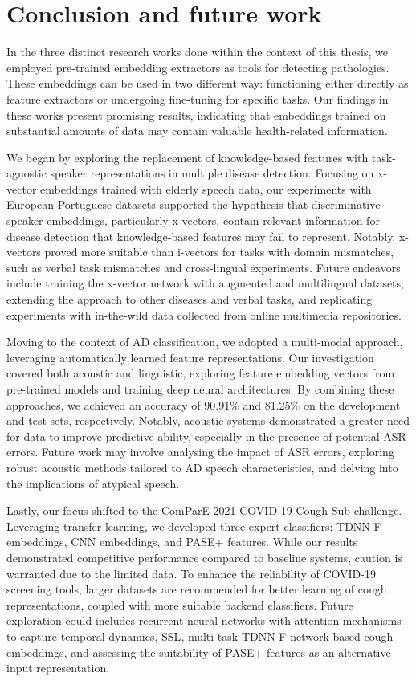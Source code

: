 \section{Conclusion and future work}
In the three distinct research works done within the context of this thesis, we employed pre-trained embedding extractors as tools for detecting pathologies. These embeddings can be used in two different way: functioning either directly as feature extractors or undergoing fine-tuning for specific tasks. Our findings in these works present promising results, indicating that embeddings trained on substantial amounts of data may contain valuable health-related information.

We began by exploring the replacement of knowledge-based features with task-agnostic speaker representations in multiple disease detection. Focusing on x-vector embeddings trained with elderly speech data, our experiments with European Portuguese datasets supported the hypothesis that discriminative speaker embeddings, particularly x-vectors, contain relevant information for disease detection that knowledge-based features may fail to represent. Notably, x-vectors proved more suitable than i-vectors for tasks with domain mismatches, such as verbal task mismatches and cross-lingual experiments. Future endeavors include training the x-vector network with augmented and multilingual datasets, extending the approach to other diseases and verbal tasks, and replicating experiments with in-the-wild data collected from online multimedia repositories.

Moving to the context of \ac{AD} classification, we adopted a multi-modal approach, leveraging automatically learned feature representations. Our investigation covered both acoustic and linguistic, exploring feature embedding vectors from pre-trained models and training deep neural architectures. By combining these approaches, we achieved an accuracy of 90.91\% and 81.25\% on the development and test sets, respectively. Notably, acoustic systems demonstrated a greater need for data to improve predictive ability, especially in the presence of potential \ac{ASR} errors. Future work may involve analysing the impact of \ac{ASR} errors, exploring robust acoustic methods tailored to \ac{AD} speech characteristics, and delving into the implications of atypical speech.

Lastly, our focus shifted to the ComParE 2021 COVID-19 Cough Sub-challenge. Leveraging transfer learning, we developed three expert classifiers: \ac{TDNN-F} embeddings, \ac{CNN} embeddings, and \ac{PASE}+ features. While our results demonstrated competitive performance compared to baseline systems, caution is warranted due to the limited data. To enhance the reliability of COVID-19 screening tools, larger datasets are recommended for better learning of cough representations, coupled with more suitable backend classifiers. Future exploration could includes recurrent neural networks with attention mechanisms to capture temporal dynamics, \ac{SSL}, multi-task \ac{TDNN-F} network-based cough embeddings, and assessing the suitability of \ac{PASE}+ features as an alternative input representation.

